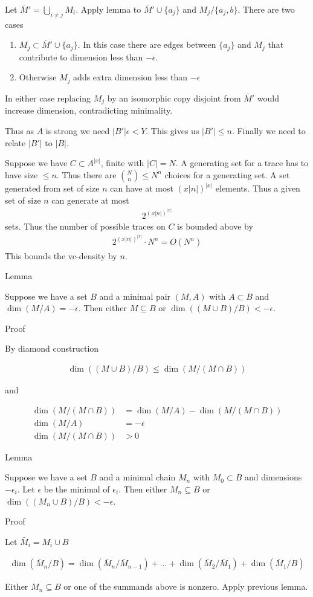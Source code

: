 \documentclass{amsart}
\begin{document}
Let $\bar M' = \bigcup_{i \neq j} M_i$.
Apply lemma to $\bar M' \cup \{a_j\}$ and $M_j / \{a_j, b\}$.
There are two cases
\begin{enumerate}
	\item $M_j \subset \bar M' \cup \{a_j\}$.
	In this case there are edges between $\{a_j\}$ and $M_j$ that contribute to dimension less than $-\epsilon$.
	\item Otherwise $M_j$ adds extra dimension less than $-\epsilon$
\end{enumerate}
In either case replacing $M_j$ by an isomorphic copy disjoint from $\bar M'$ would increase dimension, contradicting minimality.

Thus as $A$ is strong we need $|B'| \epsilon < Y$.
This gives us $|B'| \leq n$.
Finally we need to relate $|B'|$ to $|B|$.

Suppose we have $C \subset A^{|x|}$, finite with $|C| = N$.
A generating set for a trace has to have size $\leq n$.
Thus there are ${N \choose n} \leq N^n$ choices for a generating set.
A set generated from set of size $n$ can have at most $(x|n|)^{|x|}$ elements.
Thus a given set of size $n$ can generate at most
\begin{align*}
	2^{(x|n|)^{|x|}}
\end{align*}
sets.
Thus the number of possible traces on $C$ is bounded above by
\begin{align*}
  2^{(x|n|)^{|x|}} \cdot N^n = O(N^n)
\end{align*}
This bounds the vc-density by $n$.

Lemma

Suppose we have a set $B$ and a minimal pair $(M, A)$ with $A \subset B$ and $\dim(M/A) = -\epsilon$.
Then either $M \subseteq B$ or $\dim((M \cup B)/B) < -\epsilon$.

Proof

By diamond construction

\begin{align*}
	\dim((M \cup B)/B) \leq \dim(M / (M \cap B))
\end{align*}

and 

\begin{align*}
	\dim(M / (M \cap B)) &= \dim (M/A) - \dim(M / (M \cap B)) \\
	\dim (M/A) &= -\epsilon \\
	\dim(M / (M \cap B)) &> 0
\end{align*}


Lemma

Suppose we have a set $B$ and a minimal chain $M_n$ with $M_0 \subset B$ and dimensions $-\epsilon_i$.
Let $\epsilon$ be the minimal of $\epsilon_i$.
Then either $M_n \subseteq B$ or $\dim((M_n \cup B)/B) < -\epsilon$.

Proof

Let $\bar M_i = M_i \cup B$

\begin{align*}
	\dim(\bar M_n/B) = \dim(\bar M_n/\bar M_{n-1}) + \ldots + \dim(\bar M_2/\bar M_1) + \dim(\bar M_1/B)
\end{align*}

Either $M_n \subseteq B$ or one of the summands above is nonzero.
Apply previous lemma.
\end{document}
